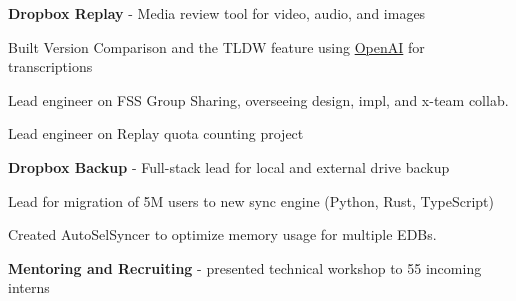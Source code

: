 \documentclass[]{deedy-resume}
\begin{document}
\begin{minipage}[t]{0.66\textwidth}
\vspace{3pt}
\begin{tightitemize}
    \item \textbf{Dropbox Replay} - Media review tool for video, audio, and images
    \vspace{5pt}
    \begin{tightitemize}
        \item Built Version Comparison and the TLDW feature using \href{https://platform.openai.com/docs/guides/completion}{OpenAI} for transcriptions
        \item Lead engineer on FSS Group Sharing, overseeing design, impl, and x-team collab.
        \item Lead engineer on Replay quota counting project
    \end{tightitemize}
    \vspace{5pt}
    \item \textbf{Dropbox Backup} - Full-stack lead for local and external drive backup
    \vspace{5pt}
    \begin{tightitemize}
        \item Lead for migration of 5M users to new sync engine (Python, Rust, TypeScript)
        \item Created AutoSelSyncer to optimize memory usage for multiple EDBs.
    \end{tightitemize}
    \vspace{5pt}
    \item \textbf{Mentoring and Recruiting} - presented technical workshop to 55 incoming interns
\end{tightitemize}
\sectionspace



\end{minipage}
\end{document}
